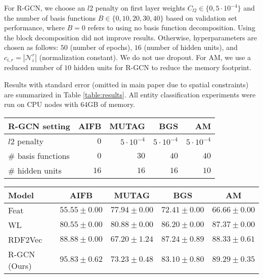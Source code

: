 \documentclass[letterpaper]{article} \usepackage{aaai18}  \usepackage{times}  \usepackage{helvet}  \usepackage{courier}  \usepackage{url}  \usepackage{graphicx}  \frenchspacing
\begin{document}
For R-GCN, we choose an $l2$ penalty on first layer weights $C_{l2}\in\{0, 5\cdot10^{-4}\}$ and the number of basis functions $B\in\{0, 10, 20, 30, 40\}$ based on validation set performance, where $B=0$ refers to using no basis function decomposition. Using the block decomposition did not improve results. Otherwise, hyperparameters are chosen as follows: $50$ (number of epochs), $16$ (number of hidden units), and $c_{i,r}=|\mathcal{N}^r_i|$ (normalization constant). We do not use dropout. For AM, we use a reduced number of $10$ hidden units for R-GCN to reduce the memory footprint.

Results with standard error (omitted in main paper due to spatial constraints) are summarized in Table \ref{table:results}. All entity classification experiments were run on CPU nodes with 64GB of memory.

\begin{table*}[htp!]
\centering
\begin{tabular}{lrrrr}
\toprule
R-GCN setting & AIFB & MUTAG & BGS & AM  \\ \midrule
$l2$ penalty & $0$ & $5\cdot 10^{-4}$ & $5\cdot 10^{-4}$ & $5\cdot 10^{-4}$ \\
\# basis functions & $0$ & $30$ & $40$ & $40$  \\
\# hidden units & $16$ & $16$ & $16$ & $10$ \\ \bottomrule
\end{tabular}
\caption{Best hyperparameter choices based on validation set performance for 2-layer R-GCN model. \label{table:hyperparams}}
\end{table*}

\begin{table*}[htp!]
\centering
\begin{tabular}{lcccc}
\toprule
Model & AIFB & MUTAG & BGS & AM  \\ \midrule
Feat & $55.55\pm0.00$ & $77.94 \pm 0.00$ & $72.41\pm0.00$ & $66.66 \pm 0.00$ \\
WL		& $80.55\pm0.00$ & $\mathbf{80.88}\pm 0.00$ & $86.20\pm 0.00$ & $87.37 \pm 0.00$  \\
RDF2Vec  & $88.88 \pm 0.00$ & $67.20 \pm 1.24$ & $\mathbf{87.24}  \pm 0.89$ & $88.33 \pm 0.61$ \\
R-GCN (Ours)			& $\mathbf{95.83} \pm 0.62$ & $73.23 \pm 0.48$ & $83.10\pm 0.80$  & $\mathbf{89.29} \pm 0.35$ \\\bottomrule
\end{tabular}
\caption{Entity classification results in accuracy (average and standard error over 10 runs) for a feature-based baseline (see main text for details), WL \cite{shervashidze2011weisfeiler,de2015substructure}, RDF2Vec \cite{ristoski2016rdf2vec}, and R-GCN (this work). Test performance is reported on the train/test set splits provided by \cite{ristoski2016collection}. \label{table:results}}
\end{table*}
 
\end{document}
